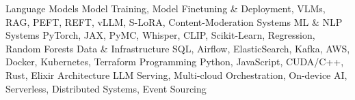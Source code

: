 










\begin{cvskills}
\cvskill
    {Language Models} %
    {Model Training, Model Finetuning \& Deployment, VLMs, RAG, PEFT, REFT, vLLM, S-LoRA, Content-Moderation Systems} %
\cvskill
    {ML \& NLP Systems} %
    {PyTorch, JAX, PyMC, Whisper, CLIP, Scikit-Learn, Regression, Random Forests} %
\cvskill
    {Data \& Infrastructure} %
    {SQL, Airflow, ElasticSearch, Kafka, AWS, Docker, Kubernetes, Terraform} %
\cvskill
    {Programming} %
    {Python, JavaScript, CUDA/C++, Rust, Elixir} %
\cvskill
    {Architecture} %
    {LLM Serving, Multi-cloud Orchestration, On-device AI, Serverless, Distributed Systems, Event Sourcing} %
\end{cvskills}